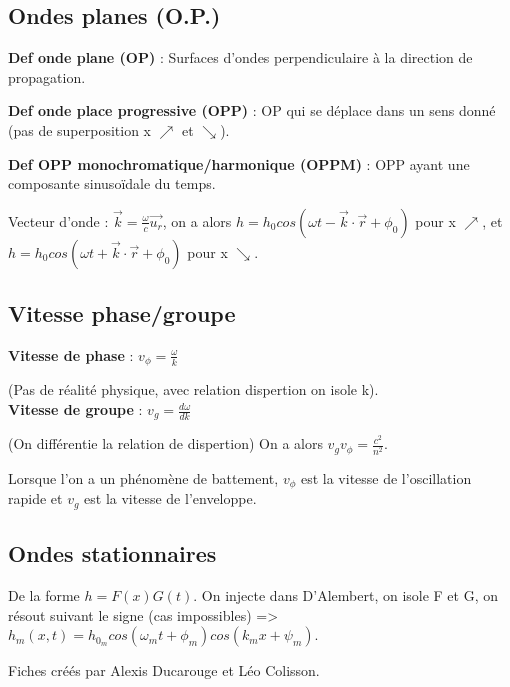 \documentclass[9pt]{article}
\begin{document}
\begin{multicols*}{2}
\section*{Ondes planes (O.P.)}
\textbf{Def onde plane (OP)} : Surfaces d'ondes perpendiculaire à la direction de propagation.

\textbf{Def onde place progressive (OPP)} : OP qui se déplace dans un sens donné (pas de superposition x $\nearrow$ et $\searrow$).

\textbf{Def OPP monochromatique/harmonique (OPPM)} : OPP ayant une composante sinusoïdale du temps.

Vecteur d'onde : $\overrightarrow{k}=\frac{\omega}{c}\overrightarrow{u_r}$, on a alors $h=h_0cos(\omega t - \overrightarrow{k}\cdot\overrightarrow{r} + \phi_0)$ pour x $\nearrow$, et $h=h_0cos(\omega t + \overrightarrow{k}\cdot\overrightarrow{r} + \phi_0)$ pour x $\searrow$.

\subsection{Vitesse phase/groupe}

\textbf{Vitesse de phase} : $\boxed{v_\phi=\frac{\omega}{k}}$

(Pas de réalité physique, avec relation dispertion on isole k).
\\

\textbf{Vitesse de groupe} : $\boxed{v_g=\frac{d\omega}{dk}}$

(On différentie la relation de dispertion) On a alors $\boxed{v_g v_{\phi} = \frac{c^2}{n^2}}$.

Lorsque l'on a un phénomène de battement, $v_\phi$ est la vitesse de l'oscillation rapide et $v_g$ est la vitesse de l'enveloppe.

\subsection{Ondes stationnaires}
De la forme $h=F(x)G(t)$.
 On injecte dans D'Alembert, on isole F et G, on résout suivant le signe (cas impossibles) => $h_m(x,t) = h_{0_m} cos(\omega_m t + \phi_m) cos(k_m x + \psi_m)$.

\footnotesize{Fiches créés par Alexis Ducarouge et Léo Colisson.}

\end{multicols*}
\end{document}
